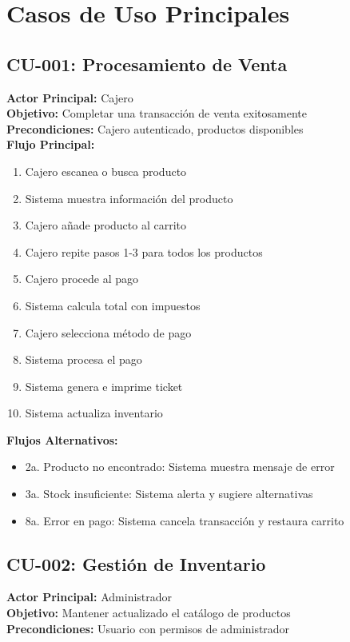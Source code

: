 \documentclass[12pt,letterpaper]{article}
\begin{document}
\section{Casos de Uso Principales}

\subsection{CU-001: Procesamiento de Venta}
\textbf{Actor Principal:} Cajero \\
\textbf{Objetivo:} Completar una transacción de venta exitosamente \\
\textbf{Precondiciones:} Cajero autenticado, productos disponibles \\

\textbf{Flujo Principal:}
\begin{enumerate}
    \item Cajero escanea o busca producto
    \item Sistema muestra información del producto
    \item Cajero añade producto al carrito
    \item Cajero repite pasos 1-3 para todos los productos
    \item Cajero procede al pago
    \item Sistema calcula total con impuestos
    \item Cajero selecciona método de pago
    \item Sistema procesa el pago
    \item Sistema genera e imprime ticket
    \item Sistema actualiza inventario
\end{enumerate}

\textbf{Flujos Alternativos:}
\begin{itemize}
    \item 2a. Producto no encontrado: Sistema muestra mensaje de error
    \item 3a. Stock insuficiente: Sistema alerta y sugiere alternativas
    \item 8a. Error en pago: Sistema cancela transacción y restaura carrito
\end{itemize}

\subsection{CU-002: Gestión de Inventario}
\textbf{Actor Principal:} Administrador \\
\textbf{Objetivo:} Mantener actualizado el catálogo de productos \\
\textbf{Precondiciones:} Usuario con permisos de administrador \\
\end{document}
